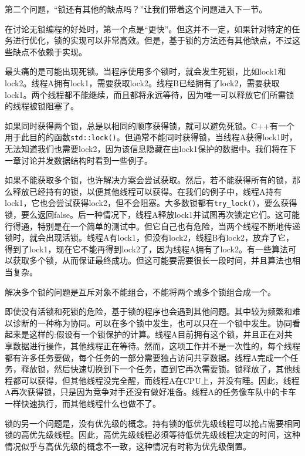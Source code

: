 第二个问题，“锁还有其他的缺点吗？”让我们带着这个问题进入下一节。


在讨论无锁编程的好处时，第一个点是“更快”。但这并不一定，如果针对特定的任务进行优化，锁的实现可以非常高效。但是，基于锁的方法还有其他缺点，不过这些缺点不依赖于实现。

最头痛的是可能出现死锁。当程序使用多个锁时，就会发生死锁，比如lock1和lock2。线程A拥有lock1，需要获取lock2。线程B已经拥有了lock2，需要获取lock1。两个线程都不能继续，而且都将永远等待，因为唯一可以释放它们所需锁的线程被锁阻塞了。

如果同时获得两个锁，总是以相同的顺序获得锁，就可以避免死锁。C++有一个用于此目的的函数\texttt{std::lock()}。但通常不能同时获得锁，当线程A获得lock1时，无法知道我们也需要lock2，因为该信息隐藏在由lock1保护的数据中。我们将在下一章讨论并发数据结构时看到一些例子。

如果不能获取多个锁，也许解决方案会尝试获取。然后，若不能获得所有的锁，那么释放已经持有的锁，以便其他线程可以获得。在我们的例子中，线程A持有lock1，它也会尝试获得lock2，但不会阻塞。大多数锁都有\texttt{try\_lock()}，要么获得锁，要么返回false。后一种情况下，线程A释放lock1并试图再次锁定它们。这可能行得通，特别是在一个简单的测试中。但它自己也有危险，当两个线程不断地传递锁时，就会出现活锁。线程A有lock1，但没有lock2，线程B有lock2，放弃了它，得到了lock1，现在它不能再得到lock2了，因为线程A拥有了lock2。有一些算法可以获取多个锁，从而保证最终成功。但这可能要需要很长一段时间，并且算法也相当复杂。

解决多个锁的问题是互斥对象不能组合，不能将两个或多个锁组合成一个。

即使没有活锁和死锁的危险，基于锁的程序也会遇到其他问题。其中较为频繁和难以诊断的一种称为协同。可以在多个锁中发生，也可以只在一个锁中发生。协同看起来是这样的:假设有一个锁保护的计算。线程A目前拥有这个锁，并且正在对共享数据进行操作，其他线程正在等待。然而，这项工作并不是一次性的，每个线程都有许多任务要做，每个任务的一部分需要独占访问共享数据。线程A完成一个任务，释放锁，然后快速切换到下一个任务，直到它再次需要锁。锁释放了，其他线程都可以获得，但其他线程没完全醒，而线程A在CPU上，并没有睡。因此，线程A再次获得锁，只是因为竞争对手还没有做好准备。线程A的任务像车队中的卡车一样快速执行，而其他线程什么也做不了。

锁的另一个问题是，没有优先级的概念。持有锁的低优先级线程可以抢占需要相同锁的高优先级线程。因此，高优先级线程必须等待低优先级线程决定的时间，这种情况似乎与高优先级的概念不一致，这种情况有时称为优先级倒置。

